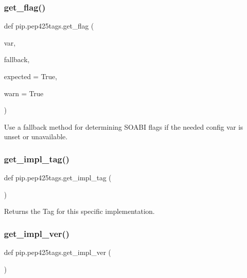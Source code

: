 \subsubsection{\texorpdfstring{get\+\_\+flag()}{get\_flag()}}
{\footnotesize\ttfamily def pip.\+pep425tags.\+get\+\_\+flag (\begin{DoxyParamCaption}\item[{}]{var,  }\item[{}]{fallback,  }\item[{}]{expected = {\ttfamily True},  }\item[{}]{warn = {\ttfamily True} }\end{DoxyParamCaption})}

\begin{DoxyVerb}Use a fallback method for determining SOABI flags if the needed config
var is unset or unavailable.\end{DoxyVerb}
 \mbox{\label{namespacepip_1_1pep425tags_ac3eee2c0d832af05428555a2da79e14c}} 
\subsubsection{\texorpdfstring{get\+\_\+impl\+\_\+tag()}{get\_impl\_tag()}}
{\footnotesize\ttfamily def pip.\+pep425tags.\+get\+\_\+impl\+\_\+tag (\begin{DoxyParamCaption}{ }\end{DoxyParamCaption})}

\begin{DoxyVerb}Returns the Tag for this specific implementation.
\end{DoxyVerb}
 \mbox{\label{namespacepip_1_1pep425tags_a34bb0775cea16453eacb13c9f6c10d5d}} 
\subsubsection{\texorpdfstring{get\+\_\+impl\+\_\+ver()}{get\_impl\_ver()}}
{\footnotesize\ttfamily def pip.\+pep425tags.\+get\+\_\+impl\+\_\+ver (\begin{DoxyParamCaption}{ }\end{DoxyParamCaption})}

